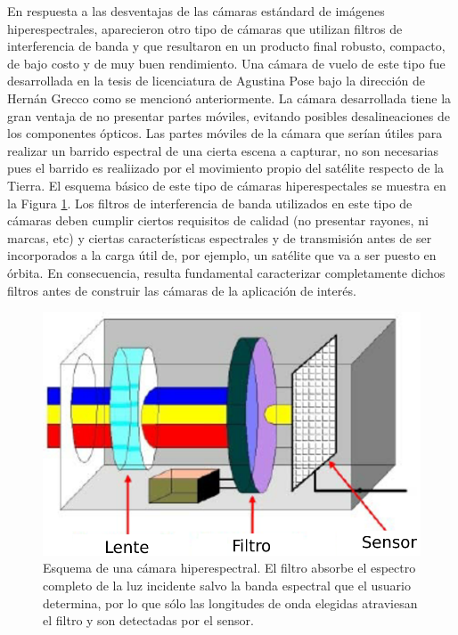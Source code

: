 \documentclass{ctuthesis}
\begin{document}
En respuesta a las desventajas de las cámaras estándard de imágenes 
hiperespectrales, aparecieron otro tipo de cámaras que utilizan filtros de 
interferencia de banda y que resultaron en un producto final robusto, compacto, 
de bajo costo y de muy buen rendimiento. Una cámara de vuelo 
de este tipo fue desarrollada en la tesis de licenciatura de Agustina Pose bajo 
la dirección de Hernán Grecco \cite{Pose2017} como se mencionó anteriormente. 
La cámara desarrollada tiene la gran ventaja de no presentar partes móviles, 
evitando posibles desalineaciones de los componentes ópticos. Las partes 
móviles de la cámara que serían útiles para realizar un barrido espectral de 
una cierta escena a capturar, no son necesarias pues el barrido es realiizado 
por el movimiento propio del satélite respecto de la Tierra. El esquema básico 
de este tipo de 
cámaras hiperespectales se muestra 
en la Figura \ref{fig:camsens}. Los filtros de interferencia de banda 
utilizados en este tipo de cámaras deben cumplir ciertos requisitos de calidad 
(no presentar rayones, ni marcas, etc) 
y ciertas características espectrales y de transmisión antes de ser 
incorporados a la carga útil de, por ejemplo, un satélite que va a ser puesto 
en 
órbita. En consecuencia, resulta fundamental caracterizar completamente dichos 
filtros antes de construir las cámaras de la aplicación de interés.

\begin{figure}[H]
	\centering
	\includegraphics[scale=0.535]{Figs/plan_de_tesis/cam_sens.png}
	\caption{ Esquema de una cámara hiperespectral. El filtro absorbe el 
	espectro completo de la luz incidente salvo la banda espectral que el 
	usuario determina, por lo que sólo las longitudes de onda elegidas 
	atraviesan el filtro y son detectadas por el sensor. \cite{Martinez2008}}
	\label{fig:camsens}
\end{figure}
\end{document}
